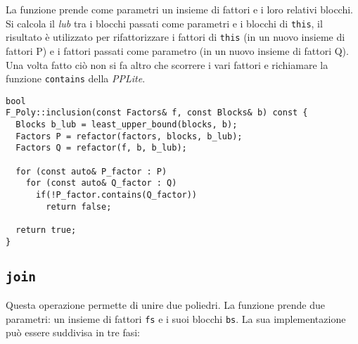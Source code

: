 \documentclass{mimosis}
\theoremstyle{definition}
\begin{document}
La funzione prende come parametri un insieme
di fattori e i loro relativi blocchi. Si calcola il \emph{lub} tra i
blocchi passati come parametri e i blocchi di \texttt{this}, il risultato è utilizzato
per rifattorizzare i fattori di \texttt{this} (in un nuovo insieme di
fattori P) e i fattori passati come parametro (in un nuovo insieme di fattori
Q). Una volta fatto ciò non si fa altro che scorrere i vari fattori e
richiamare la funzione \texttt{contains} della \emph{PPLite}.

\lstset{style=mystyle,language=C++,label= ,caption= ,captionpos=b,numbers=none}
\begin{lstlisting}
bool
F_Poly::inclusion(const Factors& f, const Blocks& b) const {
  Blocks b_lub = least_upper_bound(blocks, b);
  Factors P = refactor(factors, blocks, b_lub);
  Factors Q = refactor(f, b, b_lub);

  for (const auto& P_factor : P)
    for (const auto& Q_factor : Q)
      if(!P_factor.contains(Q_factor))
        return false;

  return true;
}
\end{lstlisting}
\subsection{\texttt{join}}
\label{sec:orgb540698}
Questa operazione permette di unire due poliedri. La funzione prende due
parametri: un insieme di fattori \texttt{fs} e i suoi blocchi \texttt{bs}. La sua implementazione può
essere suddivisa in tre fasi:
\end{document}
